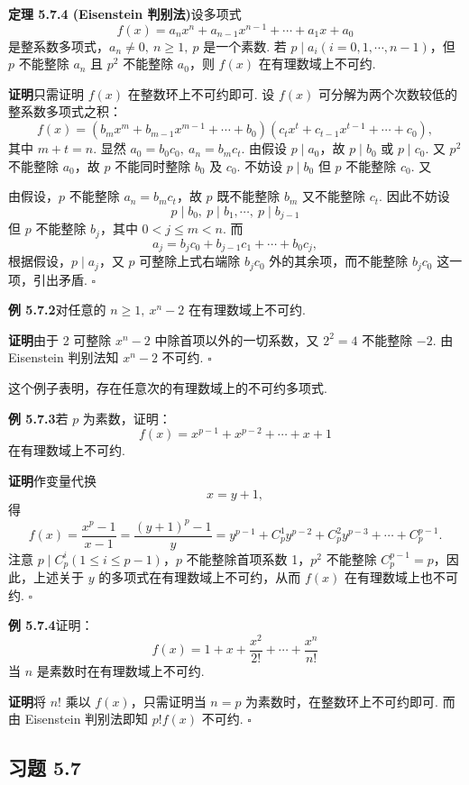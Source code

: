 \documentclass[UTF8, 12pt, fontset=fandol, oneside]{ctexart}
\begin{document}
\noindent\textbf{定理 5.7.4 (Eisenstein 判别法)}\quad 设多项式
\[
f(x)=a_nx^n+a_{n-1}x^{n-1}+\cdots+a_1x+a_0
\]
是整系数多项式，$a_n\neq 0,\ n\geq 1,\ p$ 是一个素数. 若 $p\mid a_i(i=0,1,\cdots,n-1)$，但 $p$ 不能整除 $a_n$ 且 $p^2$ 不能整除 $a_0$，则 $f(x)$ 在有理数域上不可约.

\noindent\textbf{证明}\quad 只需证明 $f(x)$ 在整数环上不可约即可. 设 $f(x)$ 可分解为两个次数较低的整系数多项式之积：
\[
f(x)=(b_mx^m+b_{m-1}x^{m-1}+\cdots+b_0)(c_tx^t+c_{t-1}x^{t-1}+\cdots+c_0),
\]
其中 $m+t=n$. 显然 $a_0=b_0c_0,\ a_n=b_mc_t$. 由假设 $p\mid a_0$，故 $p\mid b_0$ 或 $p\mid c_0$. 又 $p^2$ 不能整除 $a_0$，故 $p$ 不能同时整除 $b_0$ 及 $c_0$. 不妨设 $p\mid b_0$ 但 $p$ 不能整除 $c_0$. 又

由假设，$p$ 不能整除 $a_n=b_mc_t$，故 $p$ 既不能整除 $b_m$ 又不能整除 $c_t$. 因此不妨设
\[
p\mid b_0,\ p\mid b_1,\cdots,\ p\mid b_{j-1}
\]
但 $p$ 不能整除 $b_j$，其中 $0<j\leq m<n$. 而
\[
a_j=b_jc_0+b_{j-1}c_1+\cdots+b_0c_j,
\]
根据假设，$p\mid a_j$，又 $p$ 可整除上式右端除 $b_jc_0$ 外的其余项，而不能整除 $b_jc_0$ 这一项，引出矛盾. $\square$

\noindent\textbf{例 5.7.2}\quad 对任意的 $n\geq 1,\ x^n-2$ 在有理数域上不可约.

\noindent\textbf{证明}\quad 由于 2 可整除 $x^n-2$ 中除首项以外的一切系数，又 $2^2=4$ 不能整除 $-2$. 由 Eisenstein 判别法知 $x^n-2$ 不可约. $\square$

这个例子表明，存在任意次的有理数域上的不可约多项式.

\noindent\textbf{例 5.7.3}\quad 若 $p$ 为素数，证明：
\[
f(x)=x^{p-1}+x^{p-2}+\cdots+x+1
\]
在有理数域上不可约.

\noindent\textbf{证明}\quad 作变量代换
\[
x=y+1,
\]
得
\[
f(x)=\frac{x^p-1}{x-1}=\frac{(y+1)^p-1}{y}
=y^{p-1}+C_p^1y^{p-2}+C_p^2y^{p-3}+\cdots+C_p^{p-1}.
\]
注意 $p\mid C_p^i(1\leq i\leq p-1)$，$p$ 不能整除首项系数 1，$p^2$ 不能整除 $C_p^{p-1}=p$，因此，上述关于 $y$ 的多项式在有理数域上不可约，从而 $f(x)$ 在有理数域上也不可约. $\square$

\noindent\textbf{例 5.7.4}\quad 证明：
\[
f(x)=1+x+\frac{x^2}{2!}+\cdots+\frac{x^n}{n!}
\]
当 $n$ 是素数时在有理数域上不可约.

\noindent\textbf{证明}\quad 将 $n!$ 乘以 $f(x)$，只需证明当 $n=p$ 为素数时，在整数环上不可约即可. 而由 Eisenstein 判别法即知 $p!f(x)$ 不可约. $\square$

\subsection*{习题 5.7}
\end{document}
